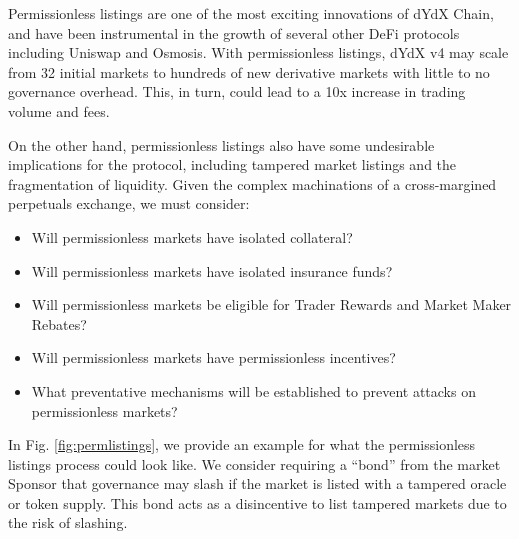         Permissionless listings are one of the most exciting innovations of dYdX Chain, and have been instrumental in the growth of several other DeFi protocols including Uniswap and Osmosis. With permissionless listings, dYdX v4 may scale from 32 initial markets to hundreds of new derivative markets with little to no governance overhead. This, in turn, could lead to a 10x increase in trading volume and fees.

        On the other hand, permissionless listings also have some undesirable implications for the protocol, including tampered market listings and the fragmentation of liquidity. Given the complex machinations of a cross-margined perpetuals exchange, we must consider:
 
        \begin{itemize}
            \item Will permissionless markets have isolated collateral?
            \item Will permissionless markets have isolated insurance funds?
            \item Will permissionless markets be eligible for Trader Rewards and Market Maker Rebates?
            \item Will permissionless markets have permissionless incentives?
            \item What preventative mechanisms will be established to prevent attacks on permissionless markets?
        \end{itemize}

        In Fig. \ref{fig:permlistings}, we provide an example for what the permissionless listings process could look like. We consider requiring a ``bond'' from the market Sponsor that governance may slash if the market is listed with a tampered oracle or token supply. This bond acts as a disincentive to list tampered markets due to the risk of slashing.  
        
